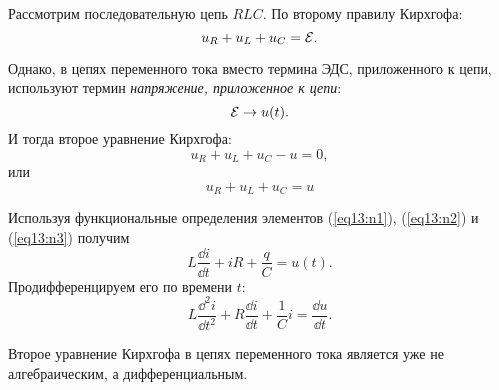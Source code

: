     Рассмотрим последовательную цепь \( RLC \). По второму правилу Кирхгофа:
    \[
        u_R + u_L + u_C = \mathcal{E}.
    \]

    Однако, в цепях переменного тока вместо термина ЭДС, приложенного к цепи,
    используют термин \textit{напряжение, приложенное к цепи}:
    \[
        \mathcal{E} \to u(t).
    \]
    И тогда второе уравнение Кирхгофа:
    \[
        u_R + u_L + u_C - u = 0,
    \]
    или
    \begin{equation}
        u_R + u_L + u_C = u
    \end{equation}

    Используя функциональные определения элементов (\ref{eq13:n1}),
    (\ref{eq13:n2}) и (\ref{eq13:n3}) получим
    \[
        L\frac{\dd i}{\dd t} + iR + \frac{q}{C} = u(t).
    \]
    Продифференцируем его по времени \( t \):
    \[
        L\frac{\dd ^2i}{\dd t^2} + R\frac{\dd i}{\dd t} + \frac{1}{C}i =
        \frac{\dd u}{\dd t}.
    \]

    Второе уравнение Кирхгофа в цепях переменного тока является уже не
    алгебраическим, а дифференциальным.

